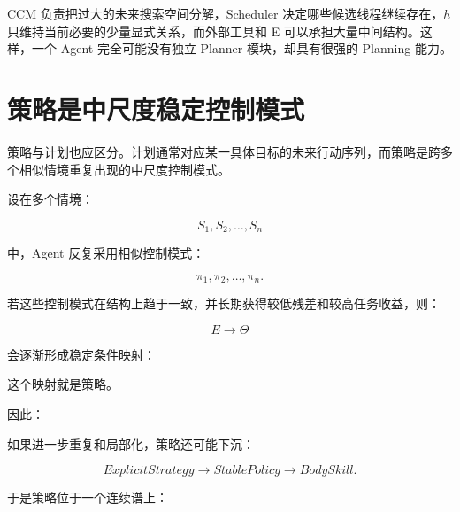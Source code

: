 \begin{statementbox}
\centering
{}
\end{statementbox}

CCM 负责把过大的未来搜索空间分解，Scheduler 决定哪些候选线程继续存在，$h$ 只维持当前必要的少量显式关系，而外部工具和 E 可以承担大量中间结构。这样，一个 Agent 完全可能没有独立 Planner 模块，却具有很强的 Planning 能力。

\section{策略是中尺度稳定控制模式}

策略与计划也应区分。计划通常对应某一具体目标的未来行动序列，而策略是跨多个相似情境重复出现的中尺度控制模式。

设在多个情境：

\[
S_1,S_2,\ldots,S_n
\]

中，Agent 反复采用相似控制模式：

\[
\pi_1,\pi_2,\ldots,\pi_n.
\]

若这些控制模式在结构上趋于一致，并长期获得较低残差和较高任务收益，则：

\[
E
\rightarrow
\Theta
\]

会逐渐形成稳定条件映射：

\begin{statementbox}
\centering
{}
\end{statementbox}

这个映射就是策略。

因此：

\begin{statementbox}
\centering
{}
\end{statementbox}

如果进一步重复和局部化，策略还可能下沉：

\[
ExplicitStrategy
\rightarrow
StablePolicy
\rightarrow
BodySkill.
\]

于是策略位于一个连续谱上：

\begin{statementbox}
\centering
{}
\end{statementbox}


